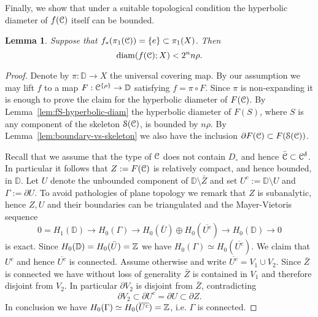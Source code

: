 \documentclass[reqno]{amsart}
\newtheorem{Lem}[Cor]{Lemma}{\bfseries}{\itshape}
\renewcommand\~[1]{\widetilde{#1}}
\def\diam{\operatorname{diam}} \def\ord{\operatorname{ord}}
\def\D{{\mathbb D}}
\def\cS{{\mathcal S}} \def\cSc{{\mathcal S \mathcal C}}
\def\he#1{{\{#1\}}}
\def\hrho{{\he\rho}}
\begin{document}
Finally, we show that under a suitable topological condition the
hyperbolic diameter of $f({\mathcal C})$ itself can be bounded.

\begin{Lem}\label{lem:fC-hyperbolic-diam}
  Suppose that $f_*(\pi_1({\mathcal C}))=\{e\}\subset\pi_1(X)$. Then
  \begin{equation}
    \diam(f(\cC);X)<2^nn\rho.
  \end{equation}
\end{Lem}
\begin{proof}
  Denote by $\pi:\D\to X$ the universal covering map. By our
  assumption we may lift $f$ to a map $F:\cC^\hrho\to\D$ satisfying
  $f=\pi\circ F$. Since $\pi$ is non-expanding it is enough to prove
  the claim for the hyperbolic diameter of $F({\mathcal C})$. By
  Lemma~\ref{lem:fS-hyperbolic-diam} the hyperbolic diameter of
  $F(S)$, where $S$ is any component of the skeleton $\cS(\cC)$, is
  bounded by $n\rho$. By Lemma~\ref{lem:boundary-vs-skeleton}
  we also have the inclusion $\partial F(\cC) \subset F(\cS(\cC))$.

  Recall that we assume that the type of ${\mathcal C}$ does not contain
  $D_\circ$ and hence $\bar{{\mathcal C}}\subset{\mathcal C}^\delta$. In particular it
  follows that $Z:=F({\mathcal C})$ is relatively compact, and hence bounded,
  in $\D$. Let $U$ denote the unbounded component of
  $\D\setminus\bar Z$ and set $U^c:=\D\setminus U$ and $\Gamma:=\partial U$. To avoid pathologies
  of plane topology we remark that $Z$ is subanalytic, hence $Z,U$ and
  their boundaries can be triangulated and the Mayer-Vietoris sequence
  \begin{equation}
    0=H_1(\D)\to H_0(\Gamma)\to H_0(\bar U)\oplus H_0(\overline{U^c})\to H_0(\D)\to0
  \end{equation}
  is exact. Since $H_0(\D)=H_0(\bar U)=\Z$ we have
  $H_0(\Gamma)\simeq H_0(\overline{U^c})$. We claim that $U^c$ and
  hence $\overline{U^c}$ is connected. Assume otherwise and write
  $\overline{U^c}=V_1\cup V_2$. Since $\bar Z$ is connected we have without loss of
  generality $\bar Z$ is contained in $V_1$ and therefore disjoint
  from $V_2$. In particular $\partial V_2$ is disjoint from
  $\bar Z$, contradicting
  \begin{equation}
    \partial V_2\subset\partial U^c=\partial U\subset\partial Z.
  \end{equation}
  In conclusion we have $H_0(\Gamma)\simeq H_0(\overline{U^c})={\mathbb Z}$,
  i.e. $\Gamma$ is connected.


\end{proof}
\end{document}
